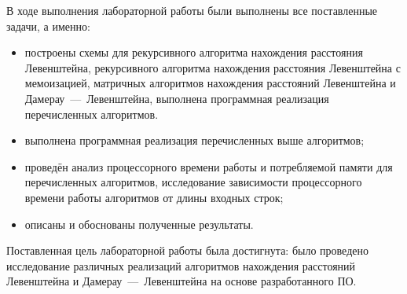 
В ходе выполнения лабораторной работы были выполнены все поставленные задачи, а именно:
\begin{itemize}
    \item построены схемы для рекурсивного алгоритма нахождения расстояния Левенштейна, рекурсивного алгоритма нахождения расстояния Левенштейна с мемоизацией, матричных алгоритмов нахождения расстояний Левенштейна и Дамерау~---~Левенштейна, выполнена программная реализация перечисленных алгоритмов.
    \item выполнена программная реализация перечисленных выше алгоритмов;
    \item проведён анализ процессорного времени работы и потребляемой памяти для перечисленных алгоритмов, исследование зависимости процессорного времени работы алгоритмов от длины входных строк;
    \item описаны и обоснованы полученные результаты.
\end{itemize}

Поставленная цель лабораторной работы была достигнута: было проведено исследование различных реализаций алгоритмов нахождения расстояний Левенштейна и Дамерау~---~Левенштейна на основе разработанного ПО. 
